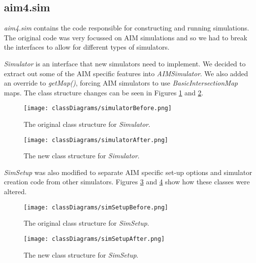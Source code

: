 \begin{appendices}
\FloatBarrier
\subsection{aim4.sim}
\label{subsec:aim4.sim}
\emph{aim4.sim} contains the code responsible for constructing and running simulations. The original code was very focussed on AIM simulations and so we had to break the interfaces to allow for different types of simulators. 

\emph{Simulator} is an interface that new simulators need to implement. We decided to extract out some of the AIM specific features into \emph{AIMSimulator}. We also added an override to \emph{getMap()}, forcing AIM simulators to use \emph{BasicIntersectionMap} maps. The class structure changes can be seen in Figures \ref{fig:simulatorBefore} and \ref{fig:simulatorAfter}.

\begin{figure}[htb]
\centering
\texttt{[image: classDiagrams/simulatorBefore.png]}
\caption{The original class structure for \emph{Simulator}.}
\label{fig:simulatorBefore}
\end{figure}

\begin{figure}[htb]
\centering
\texttt{[image: classDiagrams/simulatorAfter.png]}
\caption{The new class structure for \emph{Simulator}.}
\label{fig:simulatorAfter}
\end{figure}

\emph{SimSetup} was also modified to separate AIM specific set-up options and simulator creation code from other simulators. Figures \ref{fig:simSetupBefore} and \ref{fig:simSetupAfter} show how these classes were altered.

\begin{figure}[htb]
\centering
\texttt{[image: classDiagrams/simSetupBefore.png]}
\caption{The original class structure for \emph{SimSetup}.}
\label{fig:simSetupBefore}
\end{figure}

\begin{figure}[htb]
\centering
\texttt{[image: classDiagrams/simSetupAfter.png]}
\caption{The new class structure for \emph{SimSetup}.}
\label{fig:simSetupAfter}
\end{figure}

\FloatBarrier

\end{appendices}
